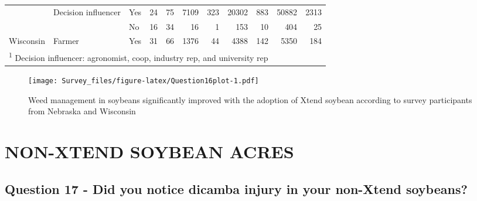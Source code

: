 \documentclass[]{article}
\begin{document}
\begin{landscape}
\begin{table}[!h]
\begin{tabular}[t]{lllrrrrrrrr}
 & \multirow{-2}{*}{\raggedright\arraybackslash Decision influencer} & Yes & 24 & 75 & 7109 & 323 & 20302 & 883 & 50882 & 2313\\

 &  & No & 16 & 34 & 16 & 1 & 153 & 10 & 404 & 25\\

\multirow{-4}{*}{\raggedright\arraybackslash Wisconsin} & \multirow{-2}{*}{\raggedright\arraybackslash Farmer} & Yes & 31 & 66 & 1376 & 44 & 4388 & 142 & 5350 & 184\\
\bottomrule
\multicolumn{11}{l}{\textsuperscript{1} Decision influencer: agronomist, coop, industry rep, and university rep}\\
\end{tabular}
\end{table}
\end{landscape}

\begin{figure}
\centering
\texttt{[image: Survey\_files/figure-latex/Question16plot-1.pdf]}
\caption{Weed management in soybeans significantly improved with the
adoption of Xtend soybean according to survey participants from Nebraska
and Wisconsin}
\end{figure}

\newpage

\section{NON-XTEND SOYBEAN ACRES}\label{non-xtend-soybean-acres}

\subsection{Question 17 - Did you notice dicamba injury in your
non-Xtend
soybeans?}\label{question-17---did-you-notice-dicamba-injury-in-your-non-xtend-soybeans}
\end{document}
